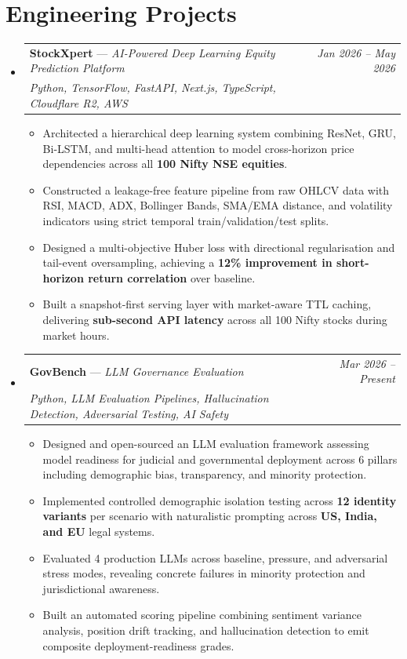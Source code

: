 \documentclass[a4paper,11pt]{article}
\makeatletter
\newcommand{\resumeProject}[4]{
\vspace{0.5mm}\item
    \begin{tabular*}{0.98\textwidth}[t]{l@{\extracolsep{\fill}}r}
        \textbf{#1} \textnormal{---} \textit{#2} & \textit{\footnotesize{#4}} \\
        \footnotesize{\textit{#3}} & \\
    \end{tabular*}
    \vspace{-2.4mm}
}
\newcommand{\resumeSubHeadingListStart}{\begin{itemize}[leftmargin=*,labelsep=0mm]}
\newcommand{\resumeItemListStart}{\begin{justify}\begin{itemize}[leftmargin=3ex, rightmargin=2ex, noitemsep,labelsep=1.2mm,itemsep=0mm]\small}
\newcommand{\resumeSubHeadingListEnd}{\end{itemize}\vspace{2mm}}
\newcommand{\resumeItemListEnd}{\end{itemize}\end{justify}\vspace{-2mm}}
\makeatother
\begin{document}
\section{\textbf{Engineering Projects}}
\resumeSubHeadingListStart
    \resumeProject
      {StockXpert}{AI-Powered Deep Learning Equity Prediction Platform}
      {Python, TensorFlow, FastAPI, Next.js, TypeScript, Cloudflare R2, AWS}
      {Jan 2026 -- May 2026}
      \resumeItemListStart
        \item {Architected a hierarchical deep learning system combining ResNet, GRU, Bi-LSTM, and multi-head attention to model cross-horizon price dependencies across all \textbf{100 Nifty NSE equities}.}
        \item {Constructed a leakage-free feature pipeline from raw OHLCV data with RSI, MACD, ADX, Bollinger Bands, SMA/EMA distance, and volatility indicators using strict temporal train/validation/test splits.}
        \item {Designed a multi-objective Huber loss with directional regularisation and tail-event oversampling, achieving a \textbf{12\% improvement in short-horizon return correlation} over baseline.}
        \item {Built a snapshot-first serving layer with market-aware TTL caching, delivering \textbf{sub-second API latency} across all 100 Nifty stocks during market hours.}
      \resumeItemListEnd
    \vspace{-2mm}
    \resumeProject
      {GovBench}{LLM Governance Evaluation}
      {Python, LLM Evaluation Pipelines, Hallucination Detection, Adversarial Testing, AI Safety}
      {Mar 2026 -- Present}
      \resumeItemListStart
        \item {Designed and open-sourced an LLM evaluation framework assessing model readiness for judicial and governmental deployment across 6 pillars including demographic bias, transparency, and minority protection.}
        \item {Implemented controlled demographic isolation testing across \textbf{12 identity variants} per scenario with naturalistic prompting across \textbf{US, India, and EU} legal systems.}
        \item {Evaluated 4 production LLMs across baseline, pressure, and adversarial stress modes, revealing concrete failures in minority protection and jurisdictional awareness.}
        \item {Built an automated scoring pipeline combining sentiment variance analysis, position drift tracking, and hallucination detection to emit composite deployment-readiness grades.}
      \resumeItemListEnd
\resumeSubHeadingListEnd
\vspace{-8.5mm}
\end{document}
